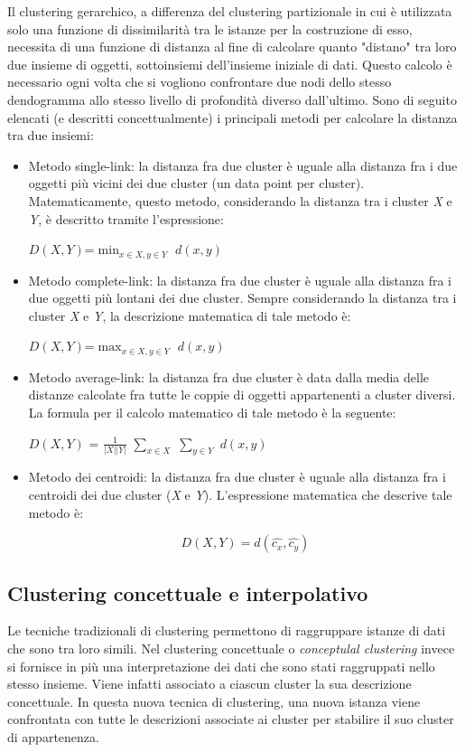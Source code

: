 \documentclass[12pt,a4paper,oneside,openright]{book}
\begin{document}
Il clustering gerarchico, a differenza del clustering partizionale in cui è utilizzata solo una funzione di dissimilarità tra le istanze per la costruzione di esso, necessita di una funzione di distanza al fine di calcolare quanto "distano" tra loro due insieme di oggetti, sottoinsiemi dell'insieme iniziale di dati. Questo calcolo è necessario ogni volta che si vogliono confrontare due nodi dello stesso dendogramma allo stesso livello di profondità diverso dall’ultimo. Sono di seguito elencati (e descritti concettualmente) i principali metodi per calcolare la distanza tra due insiemi:
\begin{itemize}
\item Metodo single-link: la distanza fra due cluster è uguale alla distanza fra i due oggetti più vicini dei due cluster (un data point per cluster). Matematicamente, questo metodo, considerando la distanza tra i cluster \textit{X} e \textit{Y}, è descritto tramite l'espressione:
\begin{center}
$D(X,Y)$=$\min_{x\in X, y\in Y}$ $d(x,y)$
\end{center}
\item Metodo complete-link: la distanza fra due cluster è uguale alla distanza fra i due oggetti più lontani dei due cluster. Sempre considerando la distanza tra i cluster \textit{X} e \textit{Y}, la descrizione matematica di tale metodo è:
\begin{center}
$D(X,Y)$=$\max_{x\in X, y\in Y}$ $d(x,y)$
\end{center}
\item Metodo average-link: la distanza fra due cluster è data dalla media delle distanze calcolate fra tutte le coppie di oggetti appartenenti a cluster diversi. La formula per il calcolo matematico di tale metodo è la seguente:
\begin{center}
$D(X,Y)$ = $\frac{1}{|X| |Y|}$ $\sum_{x \in X }$ $\sum_{ y \in Y}$ $d(x,y)$
\end{center}
\item Metodo dei centroidi: la distanza fra due cluster è uguale alla distanza fra i centroidi dei due cluster (\textit{X} e \textit{Y}). L'espressione matematica che descrive tale metodo è:
\begin{center}
$$D(X,Y) = d(\hat{c_x}, \hat{c_y})$$
\end{center}
\end{itemize}
\subsection{Clustering concettuale e interpolativo}
Le tecniche tradizionali di clustering permettono di raggruppare istanze di dati che sono tra loro simili. Nel clustering concettuale o \textit{conceptulal clustering} \cite {19a} invece si fornisce in più una interpretazione dei dati che sono stati raggruppati nello stesso insieme. Viene infatti associato a ciascun cluster la sua descrizione concettuale. In questa nuova tecnica di clustering, una nuova istanza viene confrontata con tutte le descrizioni associate ai cluster per stabilire il suo cluster di appartenenza.
\end{document}
